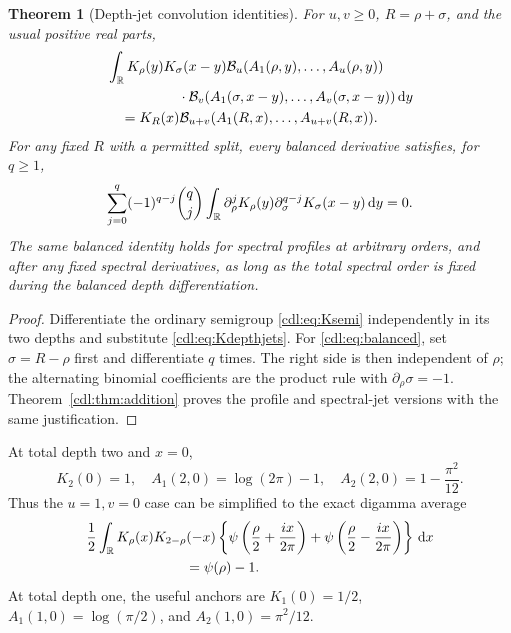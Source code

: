 \documentclass[11pt,letterpaper]{article}
\numberwithin{equation}{section}
\newtheorem{theorem}{Theorem}[section]
\theoremstyle{definition}\newtheorem{definition}[theorem]{Definition}
\theoremstyle{remark}\newtheorem{remark}[theorem]{Remark}
\newcommand{\B}{\mathcal B}\newcommand{\PP}{\mathcal P}
\begin{document}
\begin{theorem}[Depth-jet convolution identities]\label{cdl:thm:depthjets}
For $u,v\ge0$, $R=\rho+\sigma$, and the usual positive real parts,
\begin{equation}\label{cdl:eq:depthproduct}
 \begin{split}
 &\int_\R K_\rho(y)K_\sigma(x-y)
 \B_u(A_1(\rho,y),\ldots,A_u(\rho,y))\\
 &\hspace{18mm}\cdot\B_v(A_1(\sigma,x-y),\ldots,A_v(\sigma,x-y))\dd y\\
 &\quad=K_R(x)\B_{u+v}(A_1(R,x),\ldots,A_{u+v}(R,x)).
 \end{split}
\end{equation}
For any fixed $R$ with a permitted split, every balanced derivative
satisfies, for $q\ge1$,
\begin{equation}\label{cdl:eq:balanced}
 \sum_{j=0}^q(-1)^{q-j}\binom qj
 \int_\mathbb R\partial_\rho^jK_\rho(y)
          \partial_\sigma^{q-j}K_\sigma(x-y)\,\mathrm d y=0.
\end{equation}
The same balanced identity holds for spectral profiles at arbitrary
orders, and after any fixed spectral derivatives, as long as the total
spectral order is fixed during the balanced depth differentiation.
\end{theorem}
\begin{proof}
Differentiate the ordinary semigroup \eqref{cdl:eq:Ksemi} independently
in its two depths and substitute \eqref{cdl:eq:Kdepthjets}.
For \eqref{cdl:eq:balanced}, set $\sigma=R-\rho$ first and differentiate
$q$ times. The right side is then independent of $\rho$; the alternating
binomial coefficients are the product rule with
$\partial_\rho\sigma=-1$. Theorem~\ref{cdl:thm:addition} proves the
profile and spectral-jet versions with the same justification.
\end{proof}

At total depth two and $x=0$,
\[
 K_2(0)=1,\quad A_1(2,0)=\log(2\pi)-1,\quad
 A_2(2,0)=1-\frac{\pi^2}{12}.
\]
Thus the $u=1,v=0$ case can be simplified to the exact digamma average
\begin{equation}\label{cdl:eq:digammaaverage}
 \begin{split}
 &\frac12\int_\R K_\rho(x)K_{2-\rho}(-x)
 \left\{\psi\left(\frac\rho2+\frac{ix}{2\pi}\right)
       +\psi\left(\frac\rho2-\frac{ix}{2\pi}\right)\right\}\dd x\\
 &\hspace{25mm}=\psi(\rho)-1.
 \end{split}
\end{equation}
At total depth one, the useful anchors are
$K_1(0)=1/2$, $A_1(1,0)=\log(\pi/2)$, and
$A_2(1,0)=\pi^2/12$.
\end{document}
